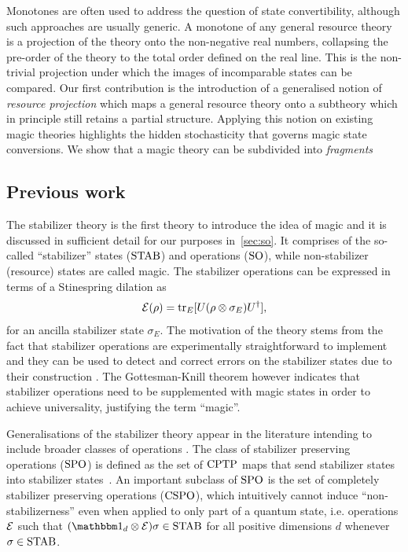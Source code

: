\documentclass[pra,
aps,
twocolumn,
superscriptaddress,
groupedaddress,
nofootinbib,
reprint
]{revtex4-1}
\begin{document}
Monotones are often used  to address the question of state convertibility, although such approaches are usually generic.
A monotone of any general resource theory is a projection of the theory onto the non-negative real numbers, collapsing the pre-order of the theory to the total order defined on the real line.
This is the  non-trivial projection under which the images of incomparable states can be compared.
Our first contribution is the introduction of a generalised notion of \emph{resource projection} which maps a general resource theory onto a subtheory which in principle still retains a partial structure.
Applying this notion on existing magic theories highlights the hidden stochasticity that governs magic state conversions.
We show that a magic theory can be subdivided into \emph{fragments} 

\subsection{Previous work}\label{sec:prev}

The stabilizer theory  is the first theory to introduce the idea of magic and it is discussed in sufficient detail for our purposes in~\cref{sec:so}. 
It comprises of the so-called ``stabilizer'' states (${\rm{STAB}}$) and operations (${\rm{SO}}$), while non-stabilizer (resource) states are called magic.
The stabilizer operations can be expressed in terms of a Stinespring dilation as 
\begin{equation}
    \mathcal{E}(\rho) = {\rm{tr}}_E [U(\rho \otimes \sigma_E)U^\dagger],
\end{equation} 
for an ancilla stabilizer state $\sigma_E$. 
The motivation of the theory stems from the fact that stabilizer operations are experimentally straightforward to implement and they can be used to detect and correct errors on the stabilizer states due to their construction .
The Gottesman-Knill theorem however indicates that stabilizer operations need to be supplemented with magic states in order to achieve universality, justifying the term ``magic''.

Generalisations of the stabilizer theory appear in the literature intending to include broader classes of operations .
The class of stabilizer preserving operations (${\rm{SPO}}$) is defined as the set of ${\rm{CPTP}}$ maps that send stabilizer states into stabilizer states~\cite{cit:ahmadi}.
An important subclass of ${\rm{SPO}}$ is the set of completely stabilizer preserving operations (${\rm{CSPO}}$), which intuitively cannot induce ``non-stabilizerness'' even when applied to only part of a quantum state, i.e. operations $\mathcal{E}$ such that $(\id_d \otimes \E ) \sigma \in \stab$ for all positive dimensions $d$ whenever $\sigma \in {\rm{STAB}}$.
\end{document}
